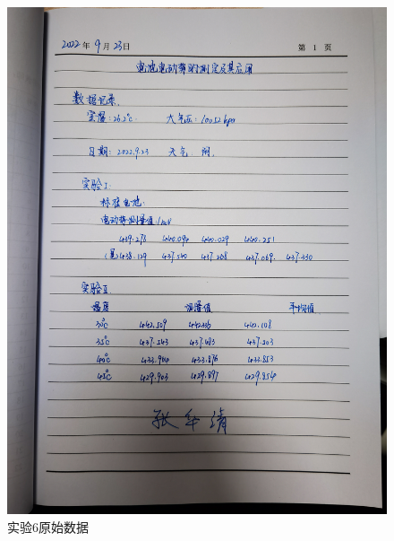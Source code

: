 \documentclass[12pt]{ctexart}
\numberwithin{equation}{section}
\begin{document}
\begin{figure}[ht]
    \centering
    \includegraphics[width=1\textwidth]{实验6原始数据.jpg}
    \caption{实验6原始数据}
    \label{fig:2}
\end{figure}
\end{document}
